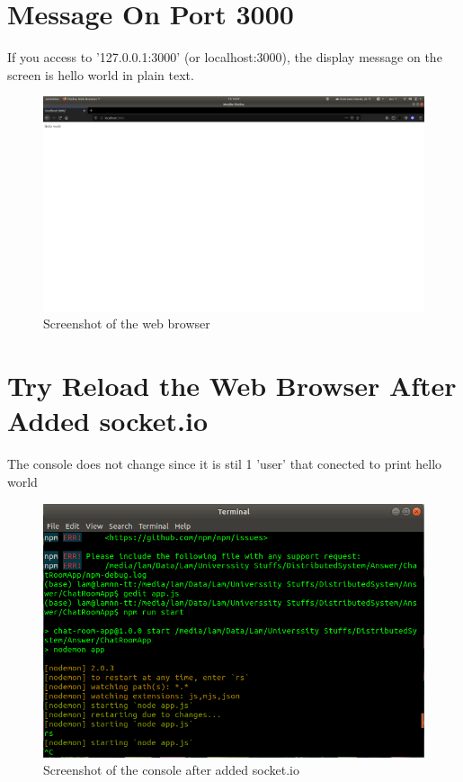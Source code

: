 \documentclass[11pt,a4paper]{report}
\begin{document}
	\section{Message On Port 3000}
	If you access to '127.0.0.1:3000' (or localhost:3000), the display message on the screen is hello world in plain text.
	\begin{figure}[h!]
  		\includegraphics[width=\linewidth]{mess-on-port-3k.png}
  		\caption{Screenshot of the web browser}
  		\label{fig:hello}
	\end{figure}
	\newpage
	\section{Try Reload the Web Browser After Added socket.io}
	The console does not change since it is stil 1 'user' that conected to print hello world
	\begin{figure}[h!]
  		\includegraphics[width=\linewidth]{reload-web-before.png}
  		\caption{Screenshot of the console after added socket.io}
  		\label{fig:console1}
	\end{figure}
	
\end{document}
